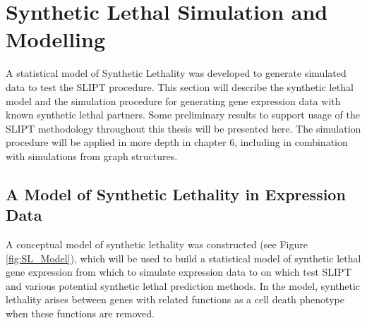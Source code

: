 
\section{Synthetic Lethal Simulation and Modelling} \label{methods:simulation_SL_expression} 

A statistical model of Synthetic Lethality was developed to generate simulated data to test the SLIPT procedure. This section will describe the synthetic lethal model and the simulation procedure for generating gene expression data with known synthetic lethal partners. Some preliminary results to support usage of the SLIPT methodology throughout this thesis will be presented here. The simulation procedure will be applied in more depth in chapter 6, including in combination with simulations from graph structures.

\subsection{A Model of Synthetic Lethality in Expression Data} \label{methods:SL_Model}

A conceptual model of synthetic lethality was constructed (see Figure \ref{fig:SL_Model}), which will be used to build a statistical model of synthetic lethal gene expression from which to simulate expression data to on which test SLIPT and various potential synthetic lethal prediction methods. In the model, synthetic lethality arises between genes with related functions as a cell death phenotype when these functions are removed.

